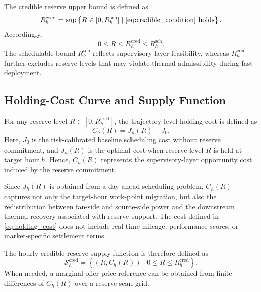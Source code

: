 \documentclass[journal]{IEEEtran}
\theoremstyle{remark}
\begin{document}
	The credible reserve upper bound is defined as
	\begin{equation}
		R_h^{\mathrm{cred}}
		=
		\sup
		\left\{
		R\in[0,R_h^{\mathrm{sch}}]
		\mid
		\eqref{eq:credible_condition}\ \text{holds}
		\right\}.
		\label{eq:credible_reserve}
	\end{equation}
	Accordingly,
	\begin{equation}
		0
		\le
		R
		\le
		R_h^{\mathrm{cred}}
		\le
		R_h^{\mathrm{sch}} .
		\label{eq:reserve_hierarchy}
	\end{equation}
	The schedulable bound $R_h^{\mathrm{sch}}$ reflects
	supervisory-layer feasibility, whereas $R_h^{\mathrm{cred}}$
	further excludes reserve levels that may violate thermal
	admissibility during fast deployment.
	
	\subsection{Holding-Cost Curve and Supply Function}
	\label{subsec:cost_supply_function}
	
	For any reserve level
	$R\in[0,R_h^{\mathrm{cred}}]$, the trajectory-level holding cost
	is defined as
	\begin{equation}
		C_h(R)
		=
		J_h(R)-J_0 .
		\label{eq:holding_cost}
	\end{equation}
	Here, $J_0$ is the risk-calibrated baseline scheduling cost
	without reserve commitment, and $J_h(R)$ is the optimal cost
	when reserve level $R$ is held at target hour $h$. Hence,
	$C_h(R)$ represents the supervisory-layer opportunity cost
	induced by the reserve commitment.
	
	Since $J_h(R)$ is obtained from a day-ahead scheduling
	problem, $C_h(R)$ captures not only the target-hour work-point
	migration, but also the redistribution between fan-side and
	source-side power and the downstream thermal recovery
	associated with reserve support. The cost defined in
	\eqref{eq:holding_cost} does not include real-time mileage,
	performance scores, or market-specific settlement terms.
	
	The hourly credible reserve supply function is therefore
	defined as
	\begin{equation}
		\mathcal{S}_h^{\mathrm{cred}}
		=
		\left\{
		(R,C_h(R))
		\mid
		0\le R\le R_h^{\mathrm{cred}}
		\right\}.
		\label{eq:final_supply_function}
	\end{equation}
	When needed, a marginal offer-price reference can be obtained
	from finite differences of $C_h(R)$ over a reserve scan grid.
	
\end{document}
